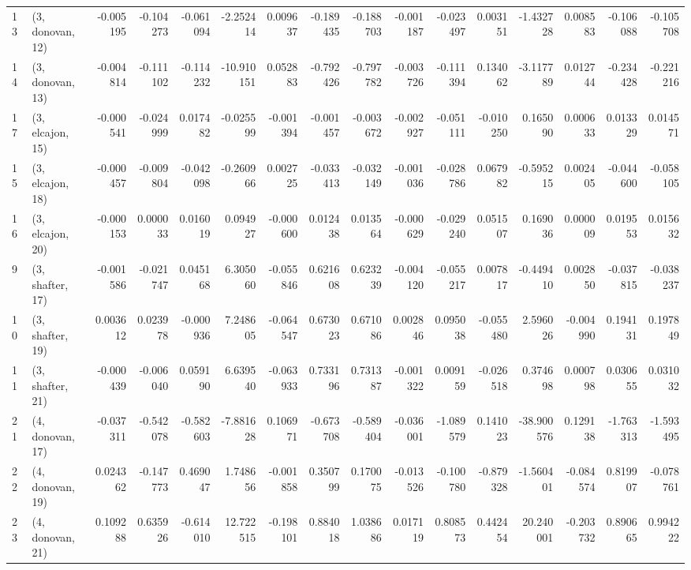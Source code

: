 \begin{tabular}{llrrrrrrrrrrrrrr}
13 &  (3, donovan, 12) &  -0.005195 & -0.104273 & -0.061094 &  -2.252414 &  0.009637 &  -0.189435 & -0.188703 & -0.001187 & -0.023497 &  0.003151 &  -1.432728 &  0.008583 & -0.106088 & -0.105708 \\
14 &  (3, donovan, 13) &  -0.004814 & -0.111102 & -0.114232 & -10.910151 &  0.052883 &  -0.792426 & -0.797782 & -0.003726 & -0.111394 &  0.134062 &  -3.117789 &  0.012744 & -0.234428 & -0.221216 \\
17 &  (3, elcajon, 15) &  -0.000541 & -0.024999 &  0.017482 &  -0.025599 & -0.001394 &  -0.001457 & -0.003672 & -0.002927 & -0.051111 & -0.010250 &   0.165090 &  0.000633 &  0.013329 &  0.014571 \\
15 &  (3, elcajon, 18) &  -0.000457 & -0.009804 & -0.042098 &  -0.260966 &  0.002725 &  -0.033413 & -0.032149 & -0.001036 & -0.028786 &  0.067982 &  -0.595215 &  0.002405 & -0.044600 & -0.058105 \\
16 &  (3, elcajon, 20) &  -0.000153 &  0.000033 &  0.016019 &   0.094927 & -0.000600 &   0.012438 &  0.013564 & -0.000629 & -0.029240 &  0.051507 &   0.169036 &  0.000009 &  0.019553 &  0.015632 \\
9  &  (3, shafter, 17) &  -0.001586 & -0.021747 &  0.045168 &   6.305060 & -0.055846 &   0.621608 &  0.623239 & -0.004120 & -0.055217 &  0.007817 &  -0.449410 &  0.002850 & -0.037815 & -0.038237 \\
10 &  (3, shafter, 19) &   0.003612 &  0.023978 & -0.000936 &   7.248605 & -0.064547 &   0.673023 &  0.671086 &  0.002846 &  0.095038 & -0.055480 &   2.596026 & -0.004990 &  0.194131 &  0.197849 \\
11 &  (3, shafter, 21) &  -0.000439 & -0.006040 &  0.059190 &   6.639540 & -0.063933 &   0.733196 &  0.731387 & -0.001322 &  0.009159 & -0.026518 &   0.374698 &  0.000798 &  0.030655 &  0.031032 \\
21 &  (4, donovan, 17) &  -0.037311 & -0.542078 & -0.582603 &  -7.881628 &  0.106971 &  -0.673708 & -0.589404 & -0.036001 & -1.089579 &  0.141023 & -38.900576 &  0.129138 & -1.763313 & -1.593495 \\
22 &  (4, donovan, 19) &   0.024362 & -0.147773 &  0.469047 &   1.748656 & -0.001858 &   0.350799 &  0.170075 & -0.013526 & -0.100780 & -0.879328 &  -1.560401 & -0.084574 &  0.819907 & -0.078761 \\
23 &  (4, donovan, 21) &   0.109288 &  0.635926 & -0.614010 &  12.722515 & -0.198101 &   0.884018 &  1.038686 &  0.017119 &  0.808573 &  0.442454 &  20.240001 & -0.203732 &  0.890665 &  0.994222 \\

\end{tabular}

